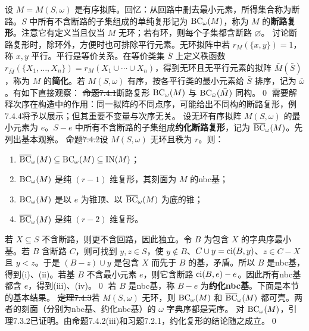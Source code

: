 设 $M=M(S,\omega)$ 是有序拟阵。回忆：从回路中删去最小元素，所得集合称为断路。$S$ 中所有不含断路的子集组成的单纯复形记为 $\operatorname{BC}_\omega(M)$，称为 $M$ 的\textbf{断路复形}。注意它有定义当且仅当 $M$ 无环；若有环，则每个子集都含断路 $\varnothing$。
讨论断路复形时，除环外，方便时也可排除平行元素。无环拟阵中若 $r_M(\{x,y\})=1$，称 $x,y$ 平行。平行是等价关系。在等价类集 $\bar S$ 上定义秩函数 $r_{\bar M}(\{X_1,\ldots,X_n\})=r_M(X_1\cup\cdots\cup X_n)$，得到无环且无平行元素的拟阵 $\bar M(\bar S)$，称为 $M$ 的\textbf{简化}。若 $M(S,\omega)$ 有序，按各平行类的最小元素给 $\bar S$ 排序，记为 $\bar\omega$。有如下直接观察：
\st{命题7.4.1}断路复形 $\operatorname{BC}_\omega(M)$ 与 $\operatorname{BC}_{\bar\omega}(\bar M)$ 同构。\qed
需要解释次序在构造中的作用：同一拟阵的不同点序，可能给出不同构的断路复形，例7.4.4将予以展示；但其重要不变量与次序无关。
设无环有序拟阵 $M(S,\omega)$ 的最小元素为 $e$。$S-e$ 中所有不含断路的子集组成\textbf{约化断路复形}，记为 $\overline{\operatorname{BC}}_\omega(M)$。先列出基本观察。
\st{命题7.4.2}设 $M(S,\omega)$ 无环且秩为 $r$。则：
\begin{enumerate}[label=(\roman*)]
\item $\overline{\operatorname{BC}}_\omega(M)\subseteq\operatorname{BC}_\omega(M)\subseteq\operatorname{IN}(M)$；
\item $\operatorname{BC}_\omega(M)$ 是纯 $(r-1)$ 维复形，其刻面为 $M$ 的nbc基；
\item $\operatorname{BC}_\omega(M)$ 是以 $e$ 为锥顶、以 $\overline{\operatorname{BC}}_\omega(M)$ 为底的锥；
\item $\overline{\operatorname{BC}}_\omega(M)$ 是纯 $(r-2)$ 维复形。
\end{enumerate}
\pr 若 $X\subseteq S$ 不含断路，则更不含回路，因此独立。令 $B$ 为包含 $X$ 的字典序最小基。若 $B$ 含断路 $C$，则可找到 $y,z\in S$，使 $y\notin B$、$C\cup y=\operatorname{ci}(B,y)$、$z\in C-X$ 且 $y<z$。于是 $(B-z)\cup y$ 是包含 $X$ 而先于 $B$ 的基，矛盾。所以 $B$ 是nbc基，得到(i)、(ii)。若基 $B$ 不含最小元素 $e$，则它含断路 $\operatorname{ci}(B,e)-e$。因此所有nbc基都含 $e$，得到(iii)、(iv)。\qed
若 $B$ 是nbc基，称 $B-e$ 为\textbf{约化nbc基}。下面是本节的基本结果。
\st{定理7.4.3}若 $M(S,\omega)$ 无环，则 $\operatorname{BC}_\omega(M)$ 和 $\overline{\operatorname{BC}}_\omega(M)$ 都可壳。两者的刻面（分别为nbc基、约化nbc基）的 $\omega$ 字典序都是壳序。
\pr 对 $\operatorname{BC}_\omega(M)$，引理7.3.2已证明。由命题7.4.2(iii)和习题7.2.1，约化复形的结论随之成立。\qed
